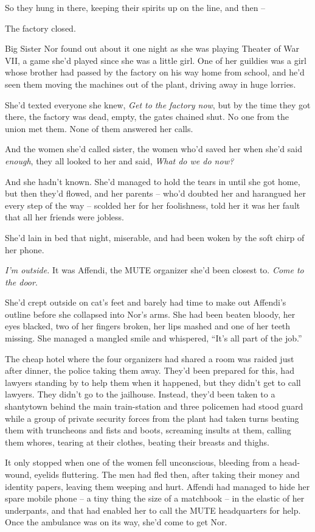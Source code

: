 So they hung in there, keeping their spirits up on the line, and
then --

The factory closed.

Big Sister Nor found out about it one night as she was playing
Theater of War VII, a game she'd played since she was a little
girl. One of her guildies was a girl whose brother had passed by
the factory on his way home from school, and he'd seen them moving
the machines out of the plant, driving away in huge lorries.

She'd texted everyone she knew, \emph{Get to the factory now}, but
by the time they got there, the factory was dead, empty, the gates
chained shut. No one from the union met them. None of them answered
her calls.

And the women she'd called sister, the women who'd saved her when
she'd said \emph{enough}, they all looked to her and said,
\emph{What do we do now?}

And she hadn't known. She'd managed to hold the tears in until she
got home, but then they'd flowed, and her parents -- who'd doubted
her and harangued her every step of the way -- scolded her for her
foolishness, told her it was her fault that all her friends were
jobless.

She'd lain in bed that night, miserable, and had been woken by the
soft chirp of her phone.

\emph{I'm outside.} It was Affendi, the MUTE organizer she'd been
closest to. \emph{Come to the door}.

She'd crept outside on cat's feet and barely had time to make out
Affendi's outline before she collapsed into Nor's arms. She had
been beaten bloody, her eyes blacked, two of her fingers broken,
her lips mashed and one of her teeth missing. She managed a mangled
smile and whispered, ``It's all part of the job.''

The cheap hotel where the four organizers had shared a room was
raided just after dinner, the police taking them away. They'd been
prepared for this, had lawyers standing by to help them when it
happened, but they didn't get to call lawyers. They didn't go to
the jailhouse. Instead, they'd been taken to a shantytown behind
the main train-station and three policemen had stood guard while a
group of private security forces from the plant had taken turns
beating them with truncheons and fists and boots, screaming insults
at them, calling them whores, tearing at their clothes, beating
their breasts and thighs.

It only stopped when one of the women fell unconscious, bleeding
from a head-wound, eyelids fluttering. The men had fled then, after
taking their money and identity papers, leaving them weeping and
hurt. Affendi had managed to hide her spare mobile phone -- a tiny
thing the size of a matchbook -- in the elastic of her underpants,
and that had enabled her to call the MUTE headquarters for help.
Once the ambulance was on its way, she'd come to get Nor.

